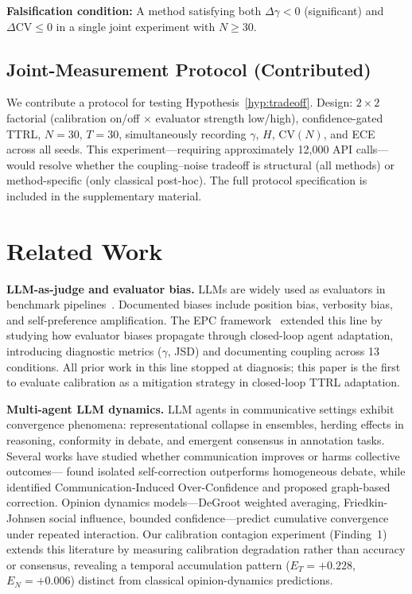 \documentclass[11pt]{article}
\newcommand{\CV}{\ensuremath{\mathrm{CV}}}
\theoremstyle{definition}
\theoremstyle{remark}
\begin{document}
\textbf{Falsification condition:} A method satisfying both $\Delta\gamma < 0$ (significant) and $\Delta\CV \leq 0$ in a single joint experiment with $N \geq 30$.

\subsection{Joint-Measurement Protocol (Contributed)}\label{sec:joint}

We contribute a protocol for testing Hypothesis~\ref{hyp:tradeoff}. Design: $2 \times 2$ factorial (calibration on/off $\times$ evaluator strength low/high), confidence-gated TTRL, $N{=}30$, $T{=}30$, simultaneously recording $\gamma$, $H$, $\CV(N)$, and ECE across all seeds. This experiment---requiring approximately 12,000 API calls---would resolve whether the coupling--noise tradeoff is structural (all methods) or method-specific (only classical post-hoc). The full protocol specification is included in the supplementary material.



\section{Related Work}

\textbf{LLM-as-judge and evaluator bias.} LLMs are widely used as evaluators in benchmark pipelines~\cite{zheng2023judging,chiang2024chatbot}. Documented biases include position bias, verbosity bias, and self-preference amplification. The EPC framework~\cite{epc2026} extended this line by studying how evaluator biases propagate through closed-loop agent adaptation, introducing diagnostic metrics ($\gamma$, JSD) and documenting coupling across 13 conditions. All prior work in this line stopped at diagnosis; this paper is the first to evaluate calibration as a mitigation strategy in closed-loop TTRL adaptation.

\textbf{Multi-agent LLM dynamics.} LLM agents in communicative settings exhibit convergence phenomena: representational collapse in ensembles, herding effects in reasoning, conformity in debate, and emergent consensus in annotation tasks. Several works have studied whether communication improves or harms collective outcomes---\citet{bertalanic2026cost} found isolated self-correction outperforms homogeneous debate, while \citet{huang2026cagecal} identified Communication-Induced Over-Confidence and proposed graph-based correction. Opinion dynamics models---DeGroot weighted averaging, Friedkin-Johnsen social influence, bounded confidence---predict cumulative convergence under repeated interaction. Our calibration contagion experiment (Finding~1) extends this literature by measuring calibration degradation rather than accuracy or consensus, revealing a temporal accumulation pattern ($E_T{=}+0.228$, $E_N{=}+0.006$) distinct from classical opinion-dynamics predictions.
\end{document}

